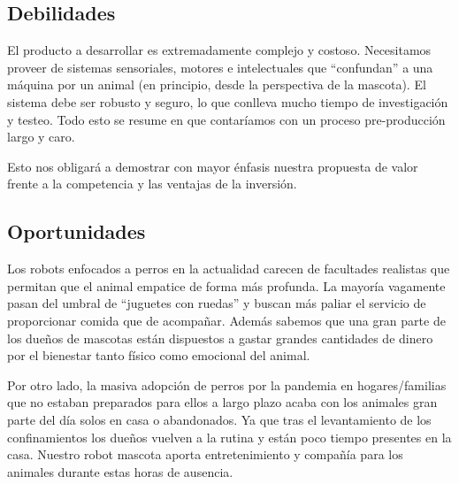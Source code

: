 \subsection{Debilidades}

El producto a desarrollar es extremadamente complejo y costoso. Necesitamos proveer de sistemas sensoriales, motores e intelectuales que ``confundan'' a una máquina por un animal (en principio, desde la perspectiva de la mascota). El sistema debe ser robusto y seguro, lo que conlleva mucho tiempo de investigación y testeo.
Todo esto se resume en que contaríamos con un proceso pre-producción largo y caro.

\vspace{\baselineskip}

Esto nos obligará a demostrar con mayor énfasis nuestra propuesta de valor frente a la competencia y las ventajas de la inversión.

\subsection{Oportunidades}

Los robots enfocados a perros en la actualidad carecen de facultades realistas que permitan que el animal empatice de forma más profunda. La mayoría vagamente pasan del umbral de ``juguetes con ruedas'' y buscan más paliar el servicio de proporcionar comida que de acompañar. Además sabemos que una gran parte de los dueños de mascotas están dispuestos a gastar grandes cantidades de dinero por el bienestar tanto físico como emocional del animal.

\vspace{\baselineskip}

Por otro lado, la masiva adopción de perros por la pandemia en hogares/familias que no estaban preparados para ellos a largo plazo acaba con los animales gran parte del día solos en casa o abandonados. Ya que tras el levantamiento de los confinamientos los dueños vuelven a la rutina y están poco tiempo presentes en la casa. Nuestro robot mascota aporta entretenimiento y compañía para los animales durante estas horas de ausencia.

